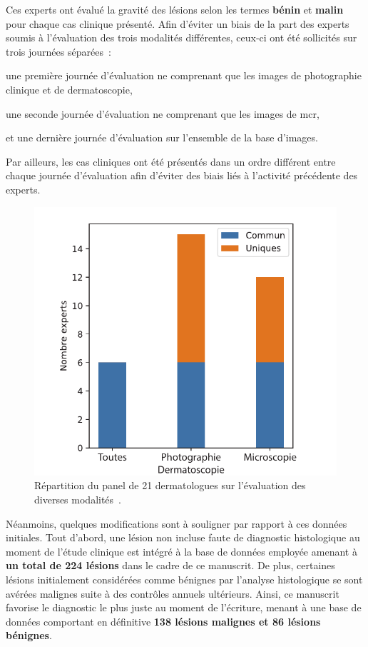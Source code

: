 Ces experts ont évalué la gravité des lésions selon les termes \textbf{bénin} et \textbf{malin} pour chaque cas clinique présenté. Afin d'éviter un biais de la part des experts soumis à l'évaluation des trois modalités différentes, ceux-ci ont été sollicités sur trois journées séparées~:
\begin{inlinerate}
    \item une première journée d'évaluation ne comprenant que les images de photographie clinique et de dermatoscopie,
    \item une seconde journée d'évaluation ne comprenant que les images de \gls{mcr},
    \item et une dernière journée d'évaluation sur l'ensemble de la base d'images.
\end{inlinerate}
Par ailleurs, les cas cliniques ont été présentés dans un ordre différent entre chaque journée d'évaluation afin d'éviter des biais liés à l'activité précédente des experts.\par

\begin{figure}[H]
    \centering
    \includegraphics[width=0.6\linewidth]{contents/chapter_4/resources/experts_evaluation.pdf}
    \caption{Répartition du panel de 21 dermatologues sur l'évaluation des diverses modalités~\cite{Cinotti2018}.}
    \label{fig:experts_evaluation}
\end{figure}\par

Néanmoins, quelques modifications sont à souligner par rapport à ces données initiales. Tout d'abord, une lésion non incluse faute de diagnostic histologique au moment de l'étude clinique est intégré à la base de données employée amenant à \textbf{un total de 224 lésions} dans le cadre de ce manuscrit. De plus, certaines lésions initialement considérées comme bénignes par l'analyse histologique se sont avérées malignes suite à des contrôles annuels ultérieurs. Ainsi, ce manuscrit favorise le diagnostic le plus juste au moment de l'écriture, menant à une base de données comportant en définitive \textbf{138 lésions malignes et 86 lésions bénignes}.\par
\clearpage


